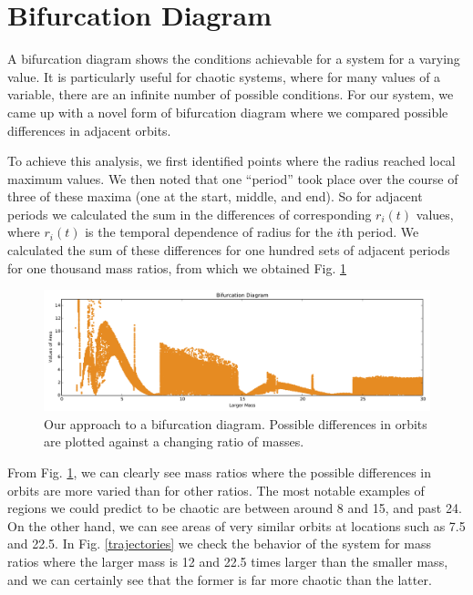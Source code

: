 \documentclass{article}
\begin{document}
\section*{Bifurcation Diagram}

A bifurcation diagram shows the conditions achievable for a system for a varying value.  It is particularly useful for chaotic systems, where for many values of a variable, there are an infinite number of possible conditions.  For our system, we came up with a novel form of bifurcation diagram where we compared possible differences in adjacent orbits.

To achieve this analysis, we first identified points where the radius reached local maximum values.  We then noted that one ``period'' took place over the course of three of these maxima (one at the start, middle, and end).  So for adjacent periods we calculated the sum in the differences of corresponding $r_{i}(t)$ values, where $r_{i}(t)$ is the temporal dependence of radius for the $i$th period.  We calculated the sum of these differences for one hundred sets of adjacent periods for one thousand mass ratios, from which we obtained Fig. \ref{bifurcation}

\begin{figure}[h]
\centering
\includegraphics[width=\textwidth]{bifurcation}
\caption{Our approach to a bifurcation diagram.  Possible differences in orbits are plotted against a changing ratio of masses.}
\label{bifurcation}
\end{figure}

From Fig. \ref{bifurcation}, we can clearly see mass ratios where the possible differences in orbits are more varied than for other ratios.  The most notable examples of regions we could predict to be chaotic are between around 8 and 15, and past 24.  On the other hand, we can see areas of very similar orbits at locations such as 7.5 and 22.5.  In Fig. \ref{trajectories} we check the behavior of the system for mass ratios where the larger mass is 12 and 22.5 times larger than the smaller mass, and we can certainly see that the former is far more chaotic than the latter.
\end{document}

